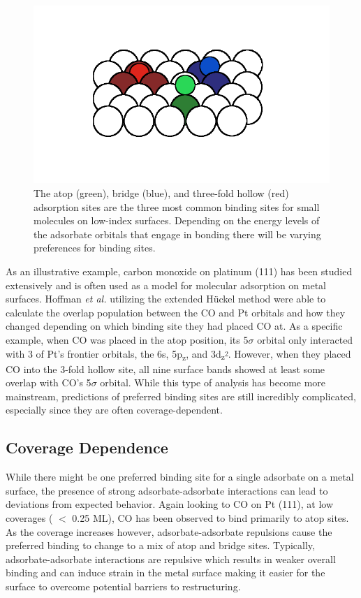 \begin{figure}[p!]
  \includegraphics[width=\linewidth]{../figures/chap1/binding.pdf}
  \caption{The atop (green), bridge (blue), and three-fold hollow (red)
adsorption sites are the three most common binding sites for small molecules on
low-index surfaces. Depending on the energy levels of the adsorbate orbitals
that engage in bonding there will be varying preferences for binding sites.}
\label{fig:binding}
\end{figure}

As an illustrative example, carbon monoxide on platinum (111) has been studied
extensively\citep{Ertl:1977cg, Kelemen:1979ad, Yeo:1997th, Wong:1991ta, Feibelman:2001qa, Deshlahra:2009wu,
Deshlahra:2012aa} and is often used as a model for molecular adsorption on
metal surfaces.  Hoffman {\em et al.} utilizing the extended H\"uckel
method\citep{Wong:1991ta} were able to calculate the overlap population between
the CO and Pt orbitals and how they changed depending on which binding site
they had placed CO at. As a specific example, when CO was placed in the atop
position, its 5$\sigma$ orbital only interacted with 3 of Pt's frontier
orbitals, the 6s, 5p\textsubscript{z}, and
3d\textsubscript{z\textsuperscript{2}}. However, when they placed CO into the
3-fold hollow site, all nine surface bands showed at least some overlap with
CO's 5$\sigma$ orbital. While this type of analysis has become more mainstream,
predictions of preferred binding sites are still incredibly complicated,
especially since they are often coverage-dependent.

\subsection{Coverage Dependence}
While there might be one preferred binding site for a single adsorbate on a
metal surface, the presence of strong adsorbate-adsorbate interactions can lead
to deviations from expected behavior. Again looking to CO on Pt (111), at low
coverages ( $<$ 0.25 ML), CO has been observed to bind primarily to atop sites.
As the coverage increases however, adsorbate-adsorbate repulsions cause the
preferred binding to change to a mix of atop and bridge sites.\citep{Deshlahra:2012aa} Typically,
adsorbate-adsorbate interactions are repulsive which results in weaker overall
binding and can induce strain in the metal surface making it easier for the
surface to overcome potential barriers to restructuring.

